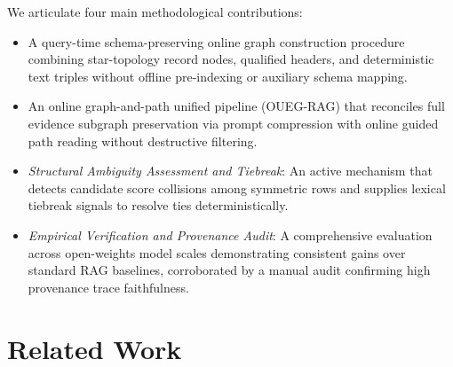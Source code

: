 \documentclass[runningheads]{llncs}
\begin{document}
We articulate four main methodological contributions:
\begin{itemize}
    \item A query-time schema-preserving online graph construction procedure combining star-topology record nodes, qualified headers, and deterministic text triples without offline pre-indexing or auxiliary schema mapping.
    \item An online graph-and-path unified pipeline (OUEG-RAG) that reconciles full evidence subgraph preservation via prompt compression with online guided path reading without destructive filtering.
    \item \emph{Structural Ambiguity Assessment and Tiebreak}: An active mechanism that detects candidate score collisions among symmetric rows and supplies lexical tiebreak signals to resolve ties deterministically.
    \item \emph{Empirical Verification and Provenance Audit}: A comprehensive evaluation across open-weights model scales demonstrating consistent gains over standard RAG baselines, corroborated by a manual audit confirming high provenance trace faithfulness.
\end{itemize}

\section{Related Work}
\label{sec:related}


\end{document}
